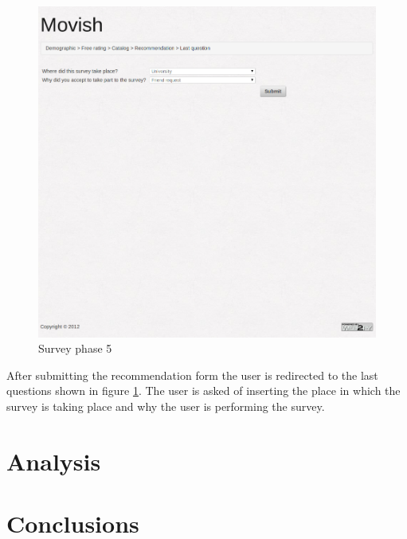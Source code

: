 \begin{figure}
  \centering
  \includegraphics[width=\textwidth]{figures/survey_localinfo.png}
  \caption{Survey phase 5}
  \label{fig:survey_phase_5}
\end{figure}

After submitting the recommendation form the user is redirected to the last questions shown in figure \ref{fig:survey_phase_5}. The user is asked of inserting the place in which the survey is taking place and why the user is performing the survey.

\section{Analysis}
\label{sec:research_analysis}

\section{Conclusions}
\label{sec:research_conclusions}


\acresetall
